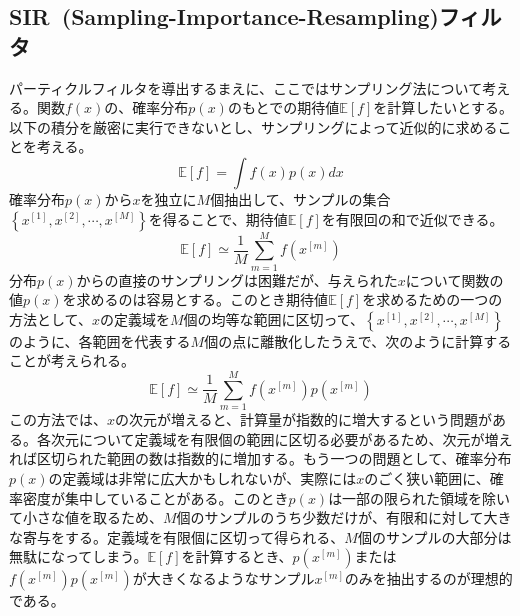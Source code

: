 \documentclass[dvipdfmx,a4paper]{jsarticle}
\begin{document}
\subsection{SIR~(Sampling-Importance-Resampling)フィルタ}
パーティクルフィルタを導出するまえに、ここではサンプリング法について考える。関数$f(x)$の、確率分布$p(x)$のもとでの期待値$\mathbb{E}[f]$を計算したいとする。以下の積分を厳密に実行できないとし、サンプリングによって近似的に求めることを考える。
\begin{equation}
	\mathbb{E}[f] = \int f(x) p(x) dx
\end{equation}
確率分布$p(x)$から$x$を独立に$M$個抽出して、サンプルの集合$\left\{ x^{[1]}, x^{[2]}, \cdots, x^{[M]} \right\}$を得ることで、期待値$\mathbb{E}[f]$を有限回の和で近似できる。
\begin{equation}
	\mathbb{E}[f] \simeq \frac{1}{M} \sum_{m = 1}^M f(x^{[m]})
\end{equation}
分布$p(x)$からの直接のサンプリングは困難だが、与えられた$x$について関数の値$p(x)$を求めるのは容易とする。このとき期待値$\mathbb{E}[f]$を求めるための一つの方法として、$x$の定義域を$M$個の均等な範囲に区切って、$\left\{ x^{[1]}, x^{[2]}, \cdots, x^{[M]} \right\}$のように、各範囲を代表する$M$個の点に離散化したうえで、次のように計算することが考えられる。
\begin{equation}
	\mathbb{E}[f] \simeq \frac{1}{M} \sum_{m = 1}^M f(x^{[m]}) p(x^{[m]})
\end{equation}
この方法では、$x$の次元が増えると、計算量が指数的に増大するという問題がある。各次元について定義域を有限個の範囲に区切る必要があるため、次元が増えれば区切られた範囲の数は指数的に増加する。もう一つの問題として、確率分布$p(x)$の定義域は非常に広大かもしれないが、実際には$x$のごく狭い範囲に、確率密度が集中していることがある。このとき$p(x)$は一部の限られた領域を除いて小さな値を取るため、$M$個のサンプルのうち少数だけが、有限和に対して大きな寄与をする。定義域を有限個に区切って得られる、$M$個のサンプルの大部分は無駄になってしまう。$\mathbb{E}[f]$を計算するとき、$p(x^{[m]})$または$f(x^{[m]})p(x^{[m]})$が大きくなるようなサンプル$x^{[m]}$のみを抽出するのが理想的である。\newline
\end{document}
